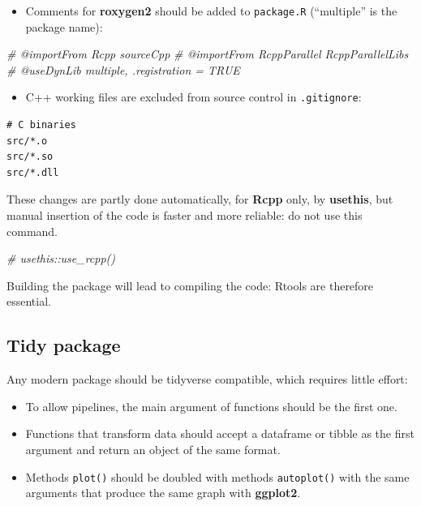 \documentclass[
  12pt,
  american,
  a4paper,
  extrafontsizes,onecolumn,openright
  ]{memoir}
\newenvironment{Shaded}{\begin{snugshade}}{\end{snugshade}}
\newcommand{\CommentTok}[1]{\textcolor[rgb]{0.56,0.35,0.01}{\textit{#1}}}
\providecommand{\tightlist}{%
  \setlength{\itemsep}{0pt}\setlength{\parskip}{0pt}}
\begin{document}
\begin{itemize}
\tightlist
\item
  Comments for \textbf{roxygen2} should be added to \texttt{package.R} (\enquote{multiple} is the package name):
\end{itemize}

\scriptsize

\begin{Shaded}
\begin{Highlighting}[]
\CommentTok{\#\textquotesingle{} @importFrom Rcpp sourceCpp}
\CommentTok{\#\textquotesingle{} @importFrom RcppParallel RcppParallelLibs}
\CommentTok{\#\textquotesingle{} @useDynLib multiple, .registration = TRUE}
\end{Highlighting}
\end{Shaded}

\normalsize

\begin{itemize}
\tightlist
\item
  C++ working files are excluded from source control in \texttt{.gitignore}:
\end{itemize}

\begin{verbatim}
# C binaries
src/*.o
src/*.so
src/*.dll
\end{verbatim}

These changes are partly done automatically, for \textbf{Rcpp} only, by \textbf{usethis}, but manual insertion of the code is faster and more reliable: do not use this command.

\scriptsize

\begin{Shaded}
\begin{Highlighting}[]
\CommentTok{\# usethis::use\_rcpp()}
\end{Highlighting}
\end{Shaded}

\normalsize

Building the package will lead to compiling the code: Rtools are therefore essential.

\hypertarget{tidy-package}{%
\subsection{Tidy package}\label{tidy-package}}

Any modern package should be tidyverse compatible, which requires little effort:

\begin{itemize}
\tightlist
\item
  To allow pipelines, the main argument of functions should be the first one.
\item
  Functions that transform data should accept a dataframe or tibble as the first argument and return an object of the same format.
\item
  Methods \texttt{plot()} should be doubled with methods \texttt{autoplot()} with the same arguments that produce the same graph with \textbf{ggplot2}.
\end{itemize}
\end{document}
